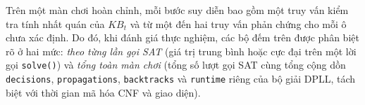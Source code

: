 Trên một màn chơi hoàn chỉnh, mỗi bước suy diễn bao gồm một truy vấn kiểm tra tính nhất quán của $KB_t$ và từ một đến hai truy vấn phản chứng cho mỗi ô chưa xác định. Do đó, khi đánh giá thực nghiệm, các bộ đếm trên được phân biệt rõ ở hai mức: \textit{theo từng lần gọi SAT} (giá trị trung bình hoặc cực đại trên một lời gọi \texttt{solve()}) và \textit{tổng toàn màn chơi} (tổng số lượt gọi SAT cùng tổng cộng dồn \texttt{decisions}, \texttt{propagations}, \texttt{backtracks} và \texttt{runtime} riêng của bộ giải DPLL, tách biệt với thời gian mã hóa CNF và giao diện).
